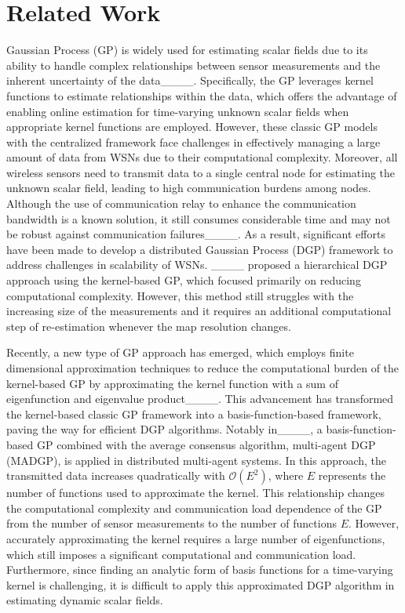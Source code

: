 \section{Related Work}
Gaussian Process (GP) is widely used for estimating scalar fields due to its ability to handle complex relationships between sensor measurements and the inherent uncertainty of the data____. Specifically, the GP leverages kernel functions to estimate relationships within the data, which offers the advantage of enabling online estimation for time-varying unknown scalar fields when appropriate kernel functions are employed. However, these classic GP models with the centralized framework face challenges in effectively managing a large amount of data from WSNs due to their computational complexity. Moreover, all wireless sensors need to transmit data to a single central node for estimating the unknown scalar field, leading to high communication burdens among nodes. Although the use of communication relay to enhance the communication bandwidth is a known solution, it still consumes considerable time and may not be robust against communication failures____. As a result, significant efforts have been made to develop a distributed Gaussian Process (DGP) framework to address challenges in scalability of WSNs.
____ proposed a hierarchical DGP approach using the kernel-based GP, which focused primarily on reducing computational complexity. However, this method still struggles with the increasing size of the measurements and it requires an additional computational step of re-estimation whenever the map resolution changes.

Recently, a new type of GP approach has emerged, which employs finite dimensional approximation techniques to reduce the computational burden of the kernel-based GP by approximating the kernel function with a sum of eigenfunction and eigenvalue product____. This advancement has transformed the kernel-based classic GP framework into a basis-function-based framework, paving the way for efficient DGP algorithms. Notably in____, a basis-function-based GP combined with the average consensus algorithm, multi-agent DGP (MADGP), is applied in distributed multi-agent systems. In this approach, the transmitted data increases quadratically with $\mathcal{O}(E^2)$, where $E$ represents the number of functions used to approximate the kernel. This relationship changes the computational complexity and communication load dependence of the GP from the number of sensor measurements to the number of functions $E$. However, accurately approximating the kernel requires a large number of eigenfunctions, which still imposes a significant computational and communication load. Furthermore, since finding an analytic form of basis functions for a time-varying kernel is challenging, it is difficult to apply this approximated DGP algorithm in estimating dynamic scalar fields.

